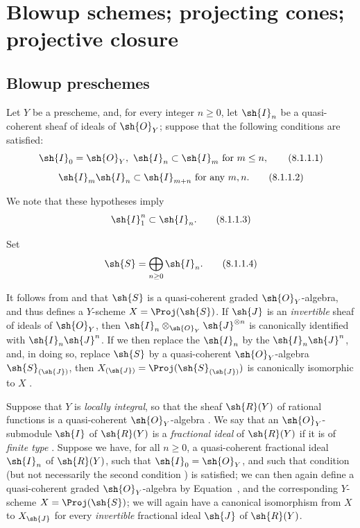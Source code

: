 \section{Blowup schemes; projecting cones; projective closure}
\label{section:II.8}

\subsection{Blowup preschemes}
\label{subsection:II.8.1}

\begin{env}[8.1.1]
\label{II.8.1.1}
Let $Y$ be a prescheme, and, for every integer $n\geq 0$, let $\sh{I}_n$ be a quasi-coherent sheaf of ideals of $\sh{O}_Y$; suppose that the following conditions are satisfied:
\[
\label{II.8.1.1.1}
  \sh{I}_0=\sh{O}_Y,\ \sh{I}_n\subset\sh{I}_m\text{ for }m\leq n,
\tag{8.1.1.1}
\]
\[
\label{II.8.1.1.2}
  \sh{I}_m\sh{I}_n\subset\sh{I}_{m+n}\text{ for any }m,n.
\tag{8.1.1.2}
\]

We note that these hypotheses imply
\[
\label{II.8.1.1.3}
  \sh{I}_1^n\subset\sh{I}_n.
\tag{8.1.1.3}
\]

Set
\[
\label{II.8.1.1.4}
  \sh{S}=\bigoplus_{n\geq 0}\sh{I}_n.
\tag{8.1.1.4}
\]

It follows from  and  that $\sh{S}$ is a quasi-coherent graded $\sh{O}_Y$-algebra, and thus defines a $Y$-scheme $X=\Proj(\sh{S})$.
If $\sh{J}$ is an \emph{invertible} sheaf of ideals of $\sh{O}_Y$, then $\sh{I}_n\otimes_{\sh{O}_Y}\sh{J}^{\otimes n}$ is canonically identified with $\sh{I}_n\sh{J}^n$.
If we then replace the $\sh{I}_n$ by the $\sh{I}_n\sh{J}^n$, and, in doing so, replace $\sh{S}$ by a quasi-coherent $\sh{O}_Y$-algebra $\sh{S}_{(\sh{J})}$, then $X_{(\sh{J})}=\Proj(\sh{S}_{(\sh{J})})$ is canonically isomorphic to $X$ .
\end{env}

\begin{env}[8.1.2]
\label{II.8.1.2}
Suppose that $Y$ is \emph{locally integral}, so that the sheaf $\sh{R}(Y)$ of rational functions is a quasi-coherent $\sh{O}_Y$-algebra .
We say that an $\sh{O}_Y$-submodule $\sh{I}$ of $\sh{R}(Y)$ is a \emph{fractional ideal} of $\sh{R}(Y)$ if it is of \emph{finite type} .
Suppose we have, for all $n\geq0$, a quasi-coherent fractional ideal $\sh{I}_n$ of $\sh{R}(Y)$, such that $\sh{I}_0 = \sh{O}_Y$, and such that condition  (but not necessarily the second condition ) is satisfied;
we can then again define a quasi-coherent graded $\sh{O}_Y$-algebra by Equation~, and the corresponding $Y$-scheme $X = \Proj(\sh{S})$;
we will again have a canonical isomorphism from $X$ to $X_{{\sh{J}}}$ for every \emph{invertible} fractional ideal $\sh{J}$ of $\sh{R}(Y)$.
\end{env}

